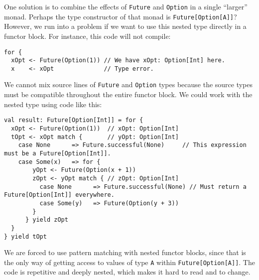 One solution is to combine the effects of \lstinline!Future! and
\lstinline!Option! in a single \textsf{``}larger\textsf{''} monad. Perhaps the type
constructor of that monad is \lstinline!Future[Option[A]]!? However,
we run into a problem if we want to use this nested type directly
in a functor block. For instance, this code will not compile:
\begin{lstlisting}
for {
  xOpt <- Future(Option(1)) // We have xOpt: Option[Int] here.
  x    <- xOpt              // Type error.
\end{lstlisting}
We cannot mix source lines of \lstinline!Future! and \lstinline!Option!
types because the source types must be compatible throughout the entire
functor block. We could work with the nested type using code like
this:
\begin{lstlisting}
val result: Future[Option[Int]] = for {
  xOpt <- Future(Option(1))  // xOpt: Option[Int]
  tOpt <- xOpt match {       // yOpt: Option[Int]
    case None      => Future.successful(None)     // This expression must be a Future[Option[Int]].
    case Some(x)   => for {
        yOpt <- Future(Option(x + 1))
        zOpt <- yOpt match { // zOpt: Option[Int]
          case None      => Future.successful(None) // Must return a Future[Option[Int]] everywhere.
          case Some(y)   => Future(Option(y + 3))
        }
      } yield zOpt
  }
} yield tOpt
\end{lstlisting}
We are forced to use pattern matching with nested functor blocks,
since that is the only way of getting access to values of type \lstinline!A!
within \lstinline!Future[Option[A]]!. The code is repetitive and
deeply nested, which makes it hard to read and to change. 

